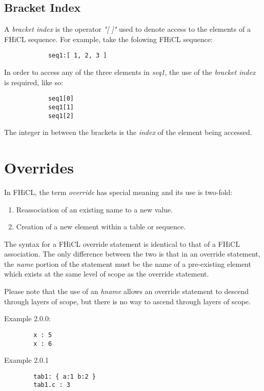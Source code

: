 \documentclass{memarticle}
\begin{document}
	\section{Bracket Index}
		A \emph{bracket index} is the operator \emph{"[ ]"} used to denote access to the elements of a FHiCL sequence.
		For example, take the folowing FHiCL sequence:
		\par
		\begin{verbatim}
			seq1:[ 1, 2, 3 ]
		\end{verbatim}
		\par
		In order to access any of the three elements in \emph{seq1},
		the use of the \emph{bracket index} is required, like so:
		\begin{verbatim}
			seq1[0]
			seq1[1]
			seq1[2]	
		\end{verbatim}
		The integer in between the brackets is the \emph{index} of the element being accessed.

\chapter{Overrides}
	In FHiCL, the term \emph{override} has special meaning and its use is two-fold:
	\begin{enumerate}
		\item Reassociation of an existing name to a new value.
		\item Creation of a new element within a table or sequence.
	\end{enumerate}
	\par
	The syntax for a FHiCL override statement is identical to that of a FHiCL association.
	The only difference between the two is that in an override statement,
	the \emph{name} portion of the statement must be the name of a pre-existing element
	which exists at the same level of scope as the override statement.
	\par
	Please note that the use of an \emph{hname} allows an override statement to descend through layers of scope,
	but there is no way to ascend through layers of scope.
	\par
	Example 2.0.0:
	\begin{verbatim}
		x : 5
		x : 6
	\end{verbatim}
	\par
	Example 2.0.1
	\begin{verbatim}
		tab1: { a:1 b:2 }
		tab1.c : 3
	\end{verbatim}
\end{document}

